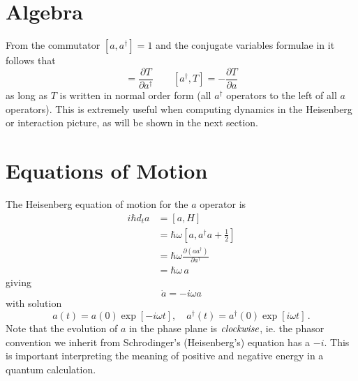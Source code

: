 \section{Algebra}

From the commutator $ [a,a^{\dagger}]=1 $ and the conjugate variables formulae in \citeinternaltype {} it follows that \begin{equation}
[a,T] = \frac{\partial T}{\partial a^{\dagger}} \qquad [a^{\dagger},T] = -\frac{\partial T}{\partial a}\end{equation}
as long as $T$ is written in normal order form (all $a^{\dagger}$ operators to the left of all $a$ operators).
This is extremely useful when computing dynamics in the Heisenberg or interaction picture, as will be shown in the next section.

\section{Equations of Motion}

The Heisenberg equation of motion for the $a$ operator is
\begin{align*}
  i\hbar d_{t}a
  &= [a,H] \\
  &= \hbar \omega [a,a^{\dagger}a+\frac{1}{2}] \\
  &= \hbar \omega \frac{\partial(aa^{\dagger})}{\partial a^{\dagger}} \\
  &= \hbar \omega \,a
\end{align*}
giving
\begin{equation*}
  \dot{a} = -i \omega a
\end{equation*}
with solution
\begin{equation}
a(t) = a(0)\exp\left[-i \omega t \right],
\quad
a^{\dagger}(t) = a^{\dagger}(0)\exp\left[i \omega t \right] \, .
\end{equation}
Note that the evolution of $a$ in the phase plane is $\emph{clockwise}$, ie. the phasor convention we inherit from Schrodinger's (Heisenberg's) equation has a $-i$.
This is important interpreting the meaning of positive and negative energy in a quantum calculation.

